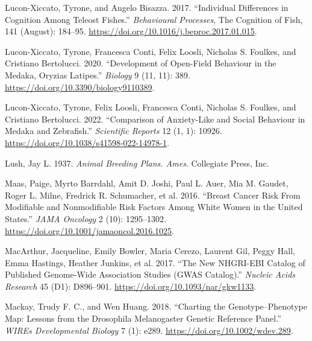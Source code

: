 \documentclass[
]{book}
\newlength{\cslhangindent}
\newlength{\cslentryspacingunit} %
\newenvironment{CSLReferences}[2] %
 {%
  \setlength{\parindent}{0pt}
  \ifodd #1
  \let\oldpar\par
  \def\par{\hangindent=\cslhangindent\oldpar}
  \fi
  \setlength{\parskip}{#2\cslentryspacingunit}
 }%
 {}
\begin{document}
\begin{CSLReferences}{1}{0}
\leavevmode{}%
Lucon-Xiccato, Tyrone, and Angelo Bisazza. 2017. {``Individual Differences in Cognition Among Teleost Fishes.''} \emph{Behavioural Processes}, The {Cognition} of {Fish}, 141 (August): 184--95. \url{https://doi.org/10.1016/j.beproc.2017.01.015}.

\leavevmode{}%
Lucon-Xiccato, Tyrone, Francesca Conti, Felix Loosli, Nicholas S. Foulkes, and Cristiano Bertolucci. 2020. {``Development of {Open-Field Behaviour} in the {Medaka}, {Oryzias} Latipes.''} \emph{Biology} 9 (11, 11): 389. \url{https://doi.org/10.3390/biology9110389}.

\leavevmode{}%
Lucon-Xiccato, Tyrone, Felix Loosli, Francesca Conti, Nicholas S. Foulkes, and Cristiano Bertolucci. 2022. {``Comparison of Anxiety-Like and Social Behaviour in Medaka and Zebrafish.''} \emph{Scientific Reports} 12 (1, 1): 10926. \url{https://doi.org/10.1038/s41598-022-14978-1}.

\leavevmode{}%
Lush, Jay L. 1937. \emph{Animal Breeding Plans. {Ames}}. {Collegiate Press, Inc}.

\leavevmode{}%
Maas, Paige, Myrto Barrdahl, Amit D. Joshi, Paul L. Auer, Mia M. Gaudet, Roger L. Milne, Fredrick R. Schumacher, et al. 2016. {``Breast {Cancer Risk From Modifiable} and {Nonmodifiable Risk Factors Among White Women} in the {United States}.''} \emph{JAMA Oncology} 2 (10): 1295--1302. \url{https://doi.org/10.1001/jamaoncol.2016.1025}.

\leavevmode{}%
MacArthur, Jacqueline, Emily Bowler, Maria Cerezo, Laurent Gil, Peggy Hall, Emma Hastings, Heather Junkins, et al. 2017. {``The New {NHGRI-EBI Catalog} of Published Genome-Wide Association Studies ({GWAS Catalog}).''} \emph{Nucleic Acids Research} 45 (D1): D896--901. \url{https://doi.org/10.1093/nar/gkw1133}.

\leavevmode{}%
Mackay, Trudy F. C., and Wen Huang. 2018. {``Charting the Genotype--Phenotype Map: Lessons from the {Drosophila} Melanogaster {Genetic Reference Panel}.''} \emph{WIREs Developmental Biology} 7 (1): e289. \url{https://doi.org/10.1002/wdev.289}.


\end{CSLReferences}
\end{document}
